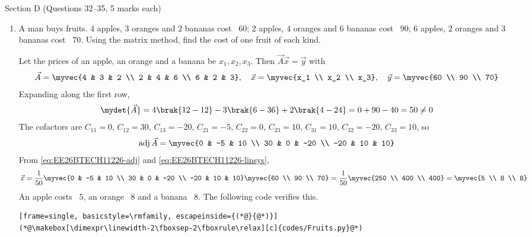 \vspace{2mm}
\noindent Section D (Questions 32--35, 5 marks each)
\begin{enumerate}[label=\thesubsection.\arabic*, ref=\thesubsection.\theenumi, start=32]
\item A man buys fruits. $4$ apples, $3$ oranges and $2$ bananas cost \rupee~$60$; $2$ apples, $4$ oranges and $6$ bananas cost \rupee~$90$; $6$ apples, $2$ oranges and $3$ bananas cost \rupee~$70$. Using the matrix method, find the cost of one fruit of each kind.
\par\solution
Let the prices of an apple, an orange and a banana be $x_1, x_2, x_3$. Then $\vec{A}\vec{x} = \vec{y}$ with
\begin{align}
	\vec{A} = \myvec{4 & 3 & 2 \\ 2 & 4 & 6 \\ 6 & 2 & 3}, \quad
	\vec{x} = \myvec{x_1 \\ x_2 \\ x_3}, \quad
	\vec{y} = \myvec{60 \\ 90 \\ 70}
\end{align}
Expanding along the first row,
\begin{align}
	\mydet{\vec{A}} = 4\brak{12-12} - 3\brak{6-36} + 2\brak{4-24} = 0 + 90 - 40 = 50 \ne 0
\end{align}
The cofactors are $C_{11}=0$, $C_{12}=30$, $C_{13}=-20$, $C_{21}=-5$, $C_{22}=0$, $C_{23}=10$, $C_{31}=10$, $C_{32}=-20$, $C_{33}=10$, so
\begin{align}
	\text{adj}\,\vec{A} = \myvec{0 & -5 & 10 \\ 30 & 0 & -20 \\ -20 & 10 & 10}
\end{align}
From \eqref{eq:EE26BTECH11226-adj} and \eqref{eq:EE26BTECH11226-linsys},
\begin{align}
	\vec{x} = \frac{1}{50}\myvec{0 & -5 & 10 \\ 30 & 0 & -20 \\ -20 & 10 & 10}\myvec{60 \\ 90 \\ 70}
	= \frac{1}{50}\myvec{250 \\ 400 \\ 400} = \myvec{5 \\ 8 \\ 8}
\end{align}
An apple costs \rupee~$5$, an orange \rupee~$8$ and a banana \rupee~$8$.
The following code verifies this.
\begin{lstlisting}[frame=single, basicstyle=\rmfamily, escapeinside={(*@}{@*)}]
(*@\makebox[\dimexpr\linewidth-2\fboxsep-2\fboxrule\relax][c]{codes/Fruits.py}@*)
\end{lstlisting}



\end{enumerate}
